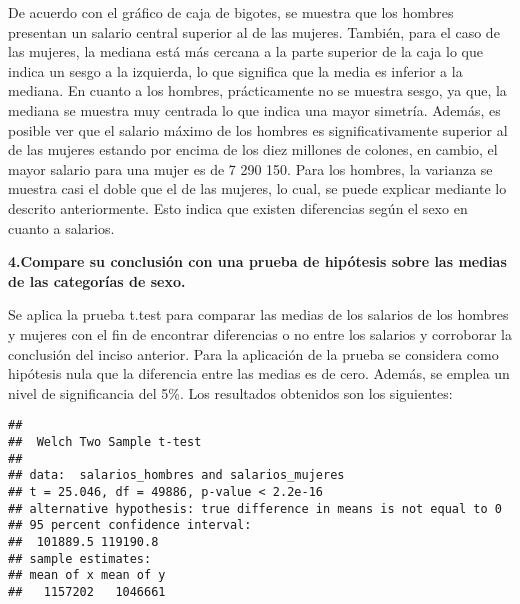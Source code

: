 \documentclass[
]{article}
\newenvironment{Shaded}{\begin{snugshade}}{\end{snugshade}}
\newcommand{\DecValTok}[1]{\textcolor[rgb]{0.00,0.00,0.81}{#1}}
\newcommand{\FunctionTok}[1]{\textcolor[rgb]{0.13,0.29,0.53}{\textbf{#1}}}
\newcommand{\NormalTok}[1]{#1}
\newcommand{\OtherTok}[1]{\textcolor[rgb]{0.56,0.35,0.01}{#1}}
\newcommand{\SpecialCharTok}[1]{\textcolor[rgb]{0.81,0.36,0.00}{\textbf{#1}}}
\begin{document}
De acuerdo con el gráfico de caja de bigotes, se muestra que los hombres
presentan un salario central superior al de las mujeres. También, para
el caso de las mujeres, la mediana está más cercana a la parte superior
de la caja lo que indica un sesgo a la izquierda, lo que significa que
la media es inferior a la mediana. En cuanto a los hombres,
prácticamente no se muestra sesgo, ya que, la mediana se muestra muy
centrada lo que indica una mayor simetría. Además, es posible ver que el
salario máximo de los hombres es significativamente superior al de las
mujeres estando por encima de los diez millones de colones, en cambio,
el mayor salario para una mujer es de 7 290 150. Para los hombres, la
varianza se muestra casi el doble que el de las mujeres, lo cual, se
puede explicar mediante lo descrito anteriormente. Esto indica que
existen diferencias según el sexo en cuanto a salarios.

\textbf{4.Compare su conclusión con una prueba de hipótesis sobre las
medias de las categorías de sexo.}

Se aplica la prueba t.test para comparar las medias de los salarios de
los hombres y mujeres con el fin de encontrar diferencias o no entre los
salarios y corroborar la conclusión del inciso anterior. Para la
aplicación de la prueba se considera como hipótesis nula que la
diferencia entre las medias es de cero. Además, se emplea un nivel de
significancia del 5\%. Los resultados obtenidos son los siguientes:

\begin{Shaded}
\end{Shaded}

\begin{verbatim}
## 
##  Welch Two Sample t-test
## 
## data:  salarios_hombres and salarios_mujeres
## t = 25.046, df = 49886, p-value < 2.2e-16
## alternative hypothesis: true difference in means is not equal to 0
## 95 percent confidence interval:
##  101889.5 119190.8
## sample estimates:
## mean of x mean of y 
##   1157202   1046661
\end{verbatim}
\end{document}
